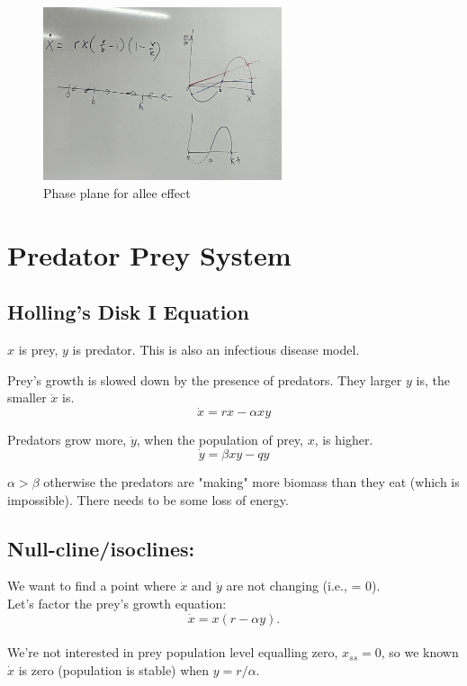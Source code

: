 \documentclass{article}
\begin{document}
\begin{figure}[htp]
    \centering
    \includegraphics[width=7cm]{phase_plane_tip.png}
    \caption{Phase plane for allee effect}
\end{figure}

\section{Predator Prey System}

\subsection{Holling's Disk I Equation}
$x$ is prey, $y$ is predator. This is also an infectious disease model.

Prey's growth is slowed down by the presence of predators. They larger $y$ is, the smaller $\dot x$ is.
$$\dot x = rx - \alpha xy$$

Predators grow more, $\dot y$, when the population of prey, $x$, is higher.
$$\dot y = \beta xy - qy$$

$\alpha > \beta$ otherwise the predators are "making" more biomass than they eat (which is impossible). There needs to be some loss of energy. \\

\subsection{Null-cline/isoclines:}
We want to find a point where $\dot x $ and $\dot y$ are not changing (i.e., = 0). \\

Let's factor the prey's growth equation: 
$$\dot x = x(r-\alpha y).$$\\

We're not interested in prey population level equalling zero, $x_{ss} = 0$, so we known $\dot x$ is zero (population is stable) when $y = r/\alpha$. \\
\end{document}
